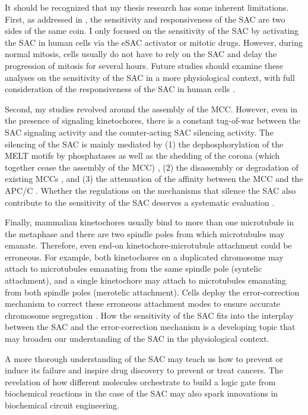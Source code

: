 It should be recognized that my thesis research has some inherent limitations. First, as addressed in , the sensitivity and responsiveness of the SAC are two sides of the same coin. I only focused on the sensitivity of the SAC by activating the SAC in human cells via the eSAC activator or mitotic drugs. However, during normal mitosis, cells usually do not have to rely on the SAC and delay the progression of mitosis for several hours. Future studies should examine these analyses on the sensitivity of the SAC in a more physiological context, with full consideration of the responsiveness of the SAC in human cells \cite{YeastMELTSpecificity}.

Second, my studies revolved around the assembly of the MCC. However, even in the presence of signaling kinetochores, there is a constant tug-of-war between the SAC signaling activity and the counter-acting SAC silencing activity. The silencing of the SAC is mainly mediated by (1) the dephosphorylation of the MELT motifs by phosphatases as well as the shedding of the corona (which together cease the assembly of the MCC) \cite{PP2A-B56, DyneinStripsCorona}, (2) the disassembly or degradation of existing MCCs \cite{BubR1MitosisTurnover, CCT-MCCDisassembly, Ubiquitylation-MCCDisassembly, UBR5-MCCDisassembly, TRIP13-p31-MAD2}, and (3) the attenuation of the affinity between the MCC and the APC/C \cite{APC-SUMO}. Whether the regulations on the mechanisms that silence the SAC also contribute to the sensitivity of the SAC deserves a systematic evaluation \cite{0thOrder, ZeroOrder}.

Finally, mammalian kinetochores usually bind to more than one microtubule in the metaphase and there are two spindle poles from which microtubules may emanate. Therefore, even end-on kinetochore-microtubule attachment could be erroneous. For example, both kinetochores on a duplicated chromosome may attach to microtubules emanating from the same spindle pole (syntelic attachment), and a single kinetochore may attach to microtubules emanating from both spindle poles (merotelic attachment). Cells deploy the error-correction mechanism to correct these erroneous attachment modes to ensure accurate chromosome segregation \cite{Syntelic+Merotelic}. How the sensitivity of the SAC fits into the interplay between the SAC and the error-correction mechanism is a developing topic that may broaden our understanding of the SAC in the physiological context.



A more thorough understanding of the SAC may teach us how to prevent or induce its failure and inspire drug discovery to prevent or treat cancers. The revelation of how different molecules orchestrate to build a  logic gate from biochemical reactions in the case of the SAC may also spark innovations in biochemical circuit engineering.